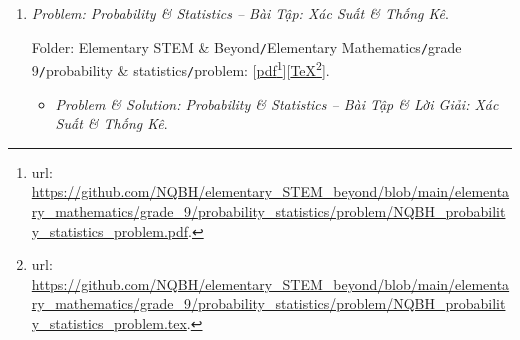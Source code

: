 \documentclass[12pt]{article}
\begin{document}
\begin{enumerate}
	Folder: {\sf Elementary STEM \& Beyond{\tt/}Elementary Mathematics{\tt/}grade 9{\tt/}circle{\tt/}problem}: [\href{https://github.com/NQBH/elementary_STEM_beyond/blob/main/elementary_mathematics/grade_9/circle/problem/NQBH_circle_problem.pdf}{pdf}\footnote{{\sc url}: \url{https://github.com/NQBH/elementary_STEM_beyond/blob/main/elementary_mathematics/grade_9/circle/problem/NQBH_circle_problem.pdf}.}][\href{https://github.com/NQBH/elementary_STEM_beyond/blob/main/elementary_mathematics/grade_9/circle/problem/NQBH_circle_problem.tex}{\TeX}\footnote{{\sc url}: \url{https://github.com/NQBH/elementary_STEM_beyond/blob/main/elementary_mathematics/grade_9/circle/problem/NQBH_circle_problem.tex}.}].
	\begin{itemize}
		\item {\it Problem \& Solution: Circle -- Bài Tập \& Lời Giải: Đường Tròn}.
		
		Folder: {\sf Elementary STEM \& Beyond{\tt/}Elementary Mathematics{\tt/}grade 9{\tt/}circle{\tt/}solution}: [\href{https://github.com/NQBH/elementary_STEM_beyond/blob/main/elementary_mathematics/grade_9/circle/solution/NQBH_circle_solution.pdf}{pdf}\footnote{{\sc url}: \url{https://github.com/NQBH/elementary_STEM_beyond/blob/main/elementary_mathematics/grade_9/circle/solution/NQBH_circle_solution.pdf}.}][\href{https://github.com/NQBH/elementary_STEM_beyond/blob/main/elementary_mathematics/grade_9/circle/solution/NQBH_circle_solution.tex}{\TeX}\footnote{{\sc url}: \url{https://github.com/NQBH/elementary_STEM_beyond/blob/main/elementary_mathematics/grade_9/circle/solution/NQBH_circle_solution.tex}.}].
	\end{itemize}
	\item {\it Problem: Probability \& Statistics -- Bài Tập: Xác Suất \& Thống Kê}.
	
	Folder: {\sf Elementary STEM \& Beyond{\tt/}Elementary Mathematics{\tt/}grade 9{\tt/}probability \& statistics{\tt/}problem}: [\href{https://github.com/NQBH/elementary_STEM_beyond/blob/main/elementary_mathematics/grade_9/probability_statistics/problem/NQBH_probability_statistics_problem.pdf}{pdf}\footnote{{\sc url}: \url{https://github.com/NQBH/elementary_STEM_beyond/blob/main/elementary_mathematics/grade_9/probability_statistics/problem/NQBH_probability_statistics_problem.pdf}.}][\href{https://github.com/NQBH/elementary_STEM_beyond/blob/main/elementary_mathematics/grade_9/probability_statistics/problem/NQBH_probability_statistics_problem.tex}{\TeX}\footnote{{\sc url}: \url{https://github.com/NQBH/elementary_STEM_beyond/blob/main/elementary_mathematics/grade_9/probability_statistics/problem/NQBH_probability_statistics_problem.tex}.}].
	\begin{itemize}
		\item {\it Problem \& Solution: Probability \& Statistics -- Bài Tập \& Lời Giải: Xác Suất \& Thống Kê}.
		

\end{itemize}
\end{enumerate}
\end{document}
